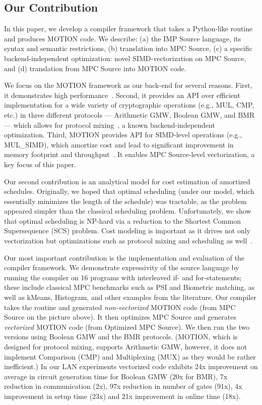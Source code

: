 \subsection{Our Contribution} In this paper, we develop a compiler framework that takes a Python-like routine and produces MOTION code. We describe: (a) the IMP Source language, its syntax and semantic restrictions, (b) translation into MPC Source, (c) a specific backend-independent optimization: novel SIMD-vectorization on MPC Source, and (d) translation from MPC Source into MOTION code. %

We focus on the MOTION framework as our back-end for several reasons. First, it demonstrates high performance~\cite{Braun:2022}. Second, it provides an API over efficient implementation for a wide variety of cryptographic operations (e.g., MUL, CMP, etc.) in three different protocols ---  Arithmetic GMW, Boolean GMW, and BMR --- which allows for protocol mixing~\cite{CCS:BDKKS18,Ishaq:2019, Fang:2022}, a known backend-independent optimization. Third, MOTION provides API for SIMD-level operations (e.g., MUL\_SIMD), which amortize cost and lead to significant improvement in memory footprint and throughput~\cite{NDSS:DemSchZoh15, CCS:ABFKLO18, Braun:2022}. It enables MPC Source-level vectorization, a key focus of this paper.

Our second contribution is an analytical model for cost estimation of amortized schedules. Originally, we hoped that optimal scheduling (under our model, which essentially minimizes the length of the schedule) was tractable, as the problem appeared simpler than the classical scheduling problem. Unfortunately, we show that optimal scheduling is NP-hard via a reduction to the Shortest Common Supersequence (SCS) problem. Cost modeling is important as it drives not only vectorization but optimizations such as protocol mixing and scheduling as well~\cite{CCS:BDKKS18,Ishaq:2019, Fang:2022}.

Our most important contribution is the implementation and evaluation of the compiler framework. We demonstrate expressivity of the source language by running the compiler on 16 programs with interleaved if- and for-statements; these include classical MPC benchmarks such as PSI and Biometric matching, as well as kMeans, Histogram, and other examples from the literature. 
Our compiler takes the routine and generated \emph{non-vectorized} MOTION code (from MPC Source on the picture above). It then optimizes MPC Source and generates 
\emph{vectorized} MOTION code (from Optimized MPC Source). We then run the two versions using Boolean GMW and the BMR protocols. (MOTION, which is designed for 
protocol mixing, supports Arithmetic GMW, however, it does not implement Comparison (CMP) and Multiplexing (MUX) as they would be rather inefficient.)
In our LAN experiments vectorized code exhibits 24x improvement on average in circuit generation time for Boolean GMW (20x for BMR), 7x reduction 
in communication (2x), 97x reduction in number of gates (91x), 4x improvement in setup time (23x) and 21x improvement in online time (18x).

